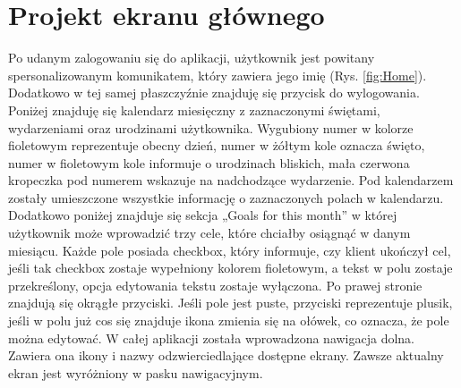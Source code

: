 \section{Projekt ekranu głównego}
Po udanym zalogowaniu się do aplikacji, użytkownik jest powitany spersonalizowanym komunikatem, który zawiera jego imię (Rys. \ref{fig:Home}). Dodatkowo w tej samej płaszczyźnie znajduję się przycisk do wylogowania. Poniżej znajduję się kalendarz miesięczny z zaznaczonymi świętami, wydarzeniami oraz urodzinami użytkownika. Wygubiony numer w kolorze fioletowym reprezentuje obecny dzień, numer w żółtym kole oznacza święto, numer w fioletowym kole informuje o urodzinach bliskich, mała czerwona kropeczka pod numerem wskazuje na nadchodzące wydarzenie. Pod kalendarzem zostały umieszczone wszystkie informację o zaznaczonych polach w kalendarzu. Dodatkowo poniżej znajduje się sekcja „Goals for this month” w której użytkownik może wprowadzić trzy cele, które chciałby osiągnąć w danym miesiącu. Każde pole posiada checkbox, który informuje, czy klient ukończył cel, jeśli tak checkbox zostaje wypełniony kolorem fioletowym, a tekst w polu zostaje przekreślony, opcja edytowania tekstu zostaje wyłączona. Po prawej stronie znajdują się okrągłe przyciski. Jeśli pole jest puste, przyciski reprezentuje plusik, jeśli w polu już cos się znajduje ikona zmienia się na ołówek, co oznacza, że pole można edytować. W całej aplikacji została wprowadzona nawigacja dolna. Zawiera ona ikony i nazwy odzwierciedlające dostępne ekrany. Zawsze aktualny ekran jest wyróżniony w pasku nawigacyjnym.

